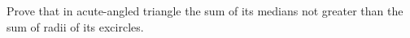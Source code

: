 \problem{}
Prove that in acute-angled triangle the sum of its medians not greater than the sum of radii of its excircles.
\solution
\endproblem
